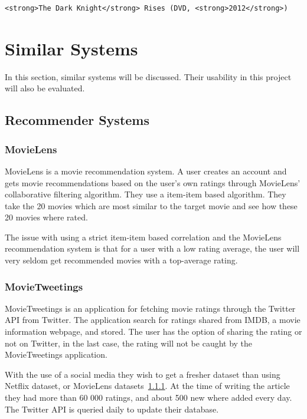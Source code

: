 \begin{lstlisting}[caption={The HTML of scraping everything from listing-\ref{listing:tweet-content-element-html} that is not a link},label={listing:tweet-text-scrape},captionpos=b]
  <strong>The Dark Knight</strong> Rises (DVD, <strong>2012</strong>)
\end{lstlisting}



\section{Similar Systems}
In this section, similar systems will be discussed. Their usability in this project will also be evaluated.


\subsection{Recommender Systems}
\subsubsection{MovieLens}\label{subsec:MovieLens}
MovieLens is a movie recommendation system. A user creates an account and gets movie recommendations based on the user's own ratings through MovieLens' collaborative filtering algorithm. They use a item-item based algorithm. They take the 20 movies which are most similar to the target movie and see how these 20 movies where rated.\cite{grouplens}

The issue with using a strict item-item based correlation and the MovieLens recommendation system is that for a user with a low rating average, the user will very seldom get recommended movies with a top-average rating.


\subsubsection{MovieTweetings}\label{subsec:MovieTweetings}
MovieTweetings is an application for fetching movie ratings through the Twitter API from Twitter. The application search for ratings shared from IMDB, a movie information webpage, and stored. The user has the option of sharing the rating or not on Twitter, in the last case, the rating will not be caught by the MovieTweetings application.

With the use of a social media they wish to get a fresher dataset than using Netflix dataset, or MovieLens datasets~\ref{subsec:MovieLens}. At the time of writing the article they had more than 60 000 ratings, and about 500 new where added every day\cite{MovieTweetings}. The Twitter API is queried daily to update their database.

